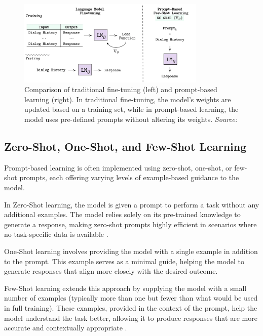 \begin{figure}[h]
    \centering
    \includegraphics[width=0.8\textwidth]{images/llms/fine-tuning-vs-prompt-learning.png}
    \caption{Comparison of traditional fine-tuning (left) and prompt-based learning (right). In traditional fine-tuning, the model's weights are updated based on a training set, while in prompt-based learning, the model uses pre-defined prompts without altering its weights. \textit{Source:} \cite{madotto2021few}}
    \label{fig:fine_tuning_vs_prompt_learning}
\end{figure}

\subsection{Zero-Shot, One-Shot, and Few-Shot Learning}

Prompt-based learning is often implemented using zero-shot, one-shot, or few-shot prompts, each offering varying levels of example-based guidance to the model.

In Zero-Shot learning, the model is given a prompt to perform a task without any additional examples. The model relies solely on its pre-trained knowledge to generate a response, making zero-shot prompts highly efficient in scenarios where no task-specific data is available \cite{radford2019language}.

One-Shot learning involves providing the model with a single example in addition to the prompt. This example serves as a minimal guide, helping the model to generate responses that align more closely with the desired outcome.

Few-Shot learning extends this approach by supplying the model with a small number of examples (typically more than one but fewer than what would be used in full training). These examples, provided in the context of the prompt, help the model understand the task better, allowing it to produce responses that are more accurate and contextually appropriate \cite{brown2020language}.

